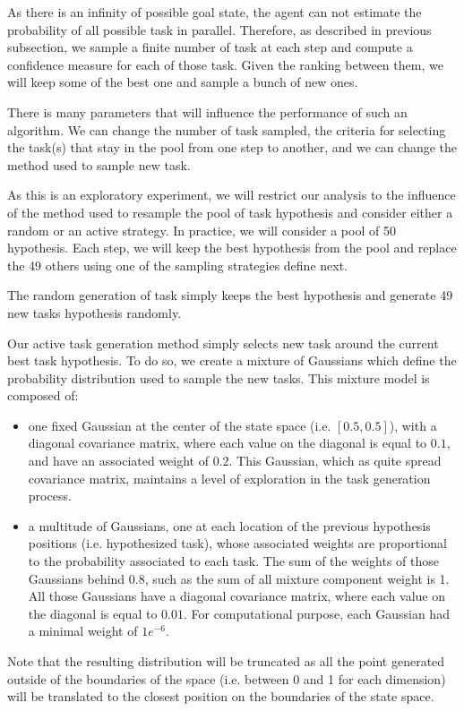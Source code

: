 As there is an infinity of possible goal state, the agent can not estimate the probability of all possible task in parallel. Therefore, as described in previous subsection, we sample a finite number of task at each step and compute a confidence measure for each of those task. Given the ranking between them, we will keep some of the best one and sample a bunch of new ones.


There is many parameters that will influence the performance of such an algorithm. We can change the number of task sampled, the criteria for selecting the task(s) that stay in the pool from one step to another, and we can change the method used to sample new task. 

As this is an exploratory experiment, we will restrict our analysis to the influence of the method used to resample the pool of task hypothesis and consider either a random or an active strategy. In practice, we will consider a pool of 50 hypothesis. Each step, we will keep the best hypothesis from the pool and replace the 49 others using one of the sampling strategies define next.

The random generation of task simply keeps the best hypothesis and generate 49 new tasks hypothesis randomly.

Our active task generation method simply selects new task around the current best task hypothesis. To do so, we create a mixture of Gaussians which define the probability distribution used to sample the new tasks. This mixture model is composed of:
\begin{itemize}
\item  one fixed Gaussian at the center of the state space (i.e. $[0.5, 0.5]$), with a diagonal covariance matrix, where each value on the diagonal is equal to $0.1$, and have an associated weight of $0.2$. This Gaussian, which as quite spread covariance matrix, maintains a level of exploration in the task generation process.
\item a multitude of Gaussians, one at each location of the previous hypothesis positions (i.e. hypothesized task), whose associated weights are proportional to the probability associated to each task. The sum of the weights of those Gaussians behind 0.8, such as the sum of all mixture component weight is 1. All those Gaussians have a diagonal covariance matrix, where each value on the diagonal is equal to $0.01$. For computational purpose, each Gaussian had a minimal weight of $1e^{-6}$.
\end{itemize}
Note that the resulting distribution will be truncated as all the point generated outside of the boundaries of the space (i.e. between 0 and 1 for each dimension) will be translated to the closest position on the boundaries of the state space.


